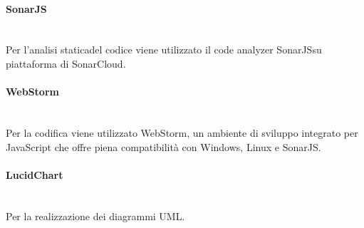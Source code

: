 		\paragraph{SonarJS}\mbox{}\\ [1mm]
		Per l'analisi statica\glosp del codice viene utilizzato il code analyzer SonarJS\glosp su piattaforma di SonarCloud.
		\paragraph{WebStorm}\mbox{}\\ [1mm]
		Per la codifica viene utilizzato WebStorm, un ambiente di sviluppo integrato per JavaScript che offre piena compatibilità con Windows, Linux e SonarJS\glo.
		\paragraph{LucidChart}\mbox{}\\ [1mm]
		Per la realizzazione dei diagrammi UML\glo.	
